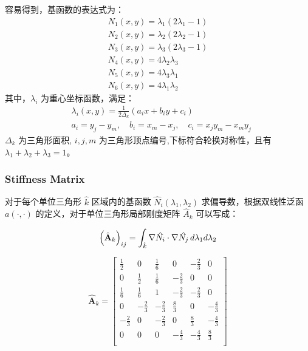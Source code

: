 \documentclass[11pt]{ctexart}
\begin{document}
容易得到，基函数的表达式为：
\begin{gather}
  N_1(x,y) = \lambda_1(2\lambda_1-1)\\
  N_2(x,y) = \lambda_2(2\lambda_2-1)\\
  N_3(x,y) = \lambda_3(2\lambda_3-1)\\
  N_4(x,y) = 4\lambda_2\lambda_3\\
  N_5(x,y) = 4\lambda_3\lambda_1\\
  N_6(x,y) = 4\lambda_1\lambda_2
\end{gather}
其中，$ \lambda_i $ 为重心坐标函数，满足：
\begin{equation}
  \begin{aligned}
    &\lambda_i(x,y) = \frac{1}{2\Delta_k} (a_i x + b_i y + c_i)\\
    &a_i = y_j-y_m, \quad b_i = x_m-x_j, \quad c_i = x_j y_m - x_m y_j
  \end{aligned}
\end{equation}
$ \Delta_k $ 为三角形面积, $ i,j,m $ 为三角形顶点编号,下标符合轮换对称性，且有 $ \lambda_1 + \lambda_2 + \lambda_3 = 1 $。

\subsubsection{Stiffness Matrix}
对于每个单位三角形 $ \hat{k} $ 区域内的基函数 $ \hat{N}_i(\lambda_1,\lambda_2) $ 求偏导数，根据双线性泛函$ a(\cdot,\cdot) $ 的定义，对于单位三角形局部刚度矩阵 $ \hat{A}_k $ 可以写成：

\begin{equation}
    \left(\hat{\mathbf{A}}_k\right)_{ij} = \int_{\hat{k}} \nabla \hat{N_i} \cdot \nabla \hat{N_j} \, d\lambda_1 d\lambda_2\\
\end{equation}

\begin{equation}
  \hat{\mathbf{A}}_k =   \begin{bmatrix}
    \frac{1}{2}& 0 & \frac{1}{6} &  0 & -\frac{2}{3} & 0\\
    0 & \frac{1}{2} & \frac{1}{6} &  -\frac{2}{3} & 0 & 0\\
    \frac{1}{6} & \frac{1}{6} & 1 & -\frac{2}{3} & -\frac{2}{3} & 0\\
    0 & -\frac{2}{3} & -\frac{2}{3} &  \frac{8}{3} & 0 & -\frac{4}{3}\\
    -\frac{2}{3} & 0 & -\frac{2}{3} & 0 & \frac{8}{3} & -\frac{4}{3}\\
    0 & 0 & 0 &  -\frac{4}{3} & -\frac{4}{3} & \frac{8}{3}\\

  \end{bmatrix}
\end{equation}
\end{document}

